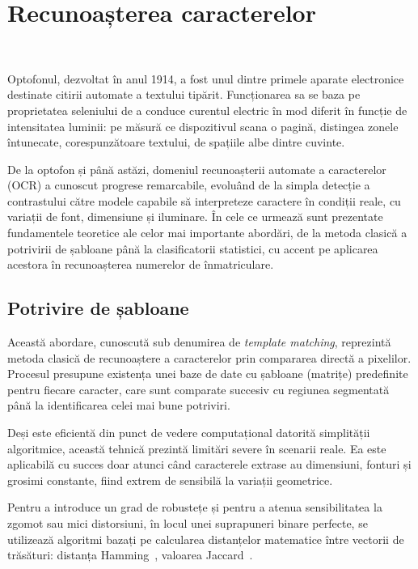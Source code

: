 \chapter{Recunoașterea caracterelor}~\label{chap:recunoastere}
\indent\par
Optofonul, dezvoltat în anul 1914, a fost unul dintre primele aparate electronice destinate citirii automate a textului tipărit. Funcționarea sa se baza pe proprietatea seleniului de a conduce curentul electric în mod diferit în funcție de intensitatea luminii: pe măsură ce dispozitivul scana o pagină, distingea zonele întunecate, corespunzătoare textului, de spațiile albe dintre cuvinte.

De la optofon și până astăzi, domeniul recunoașterii automate a caracterelor (OCR) a cunoscut progrese remarcabile, evoluând de la simpla detecție a contrastului către modele capabile să interpreteze caractere în condiții reale, cu variații de font, dimensiune și iluminare. În cele ce urmează sunt prezentate fundamentele teoretice ale celor mai importante abordări, de la metoda clasică a potrivirii de șabloane până la clasificatorii statistici, cu accent pe aplicarea acestora în recunoașterea numerelor de înmatriculare.

\section{Potrivire de șabloane}
\indent\par
Această abordare, cunoscută sub denumirea de \textit{template matching}, reprezintă metoda clasică de recunoaștere a caracterelor prin compararea directă a pixelilor. Procesul presupune existența unei baze de date cu șabloane (matrițe) predefinite pentru fiecare caracter, care sunt comparate succesiv cu regiunea segmentată până la identificarea celei mai bune potriviri.

Deși este eficientă din punct de vedere computațional datorită simplității algoritmice, această tehnică prezintă limitări severe în scenarii reale. Ea este aplicabilă cu succes doar atunci când caracterele extrase au dimensiuni, fonturi și grosimi constante, fiind extrem de sensibilă la variații geometrice.

Pentru a introduce un grad de robustețe și pentru a atenua sensibilitatea la zgomot sau mici distorsiuni, în locul unei suprapuneri binare perfecte, se utilizează algoritmi bazați pe calcularea distanțelor matematice între vectorii de trăsături: distanța Hamming~\cite{sarfraz2003saudi}, valoarea Jaccard~\cite{lee1994automatic}.

